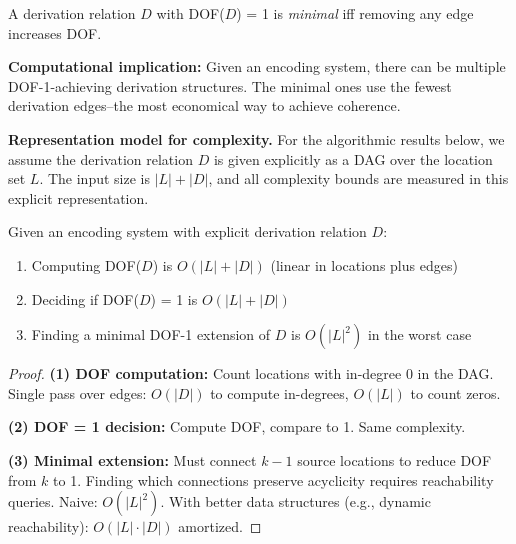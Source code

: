 \begin{corollary}[Minimal DOF = 1 Derivations]\label{cor:minimal-dof1}
A derivation relation $D$ with DOF($D$) = 1 is \emph{minimal} iff removing any edge increases DOF.
\end{corollary}

\textbf{Computational implication:} Given an encoding system, there can be multiple DOF-1-achieving derivation structures. The minimal ones use the fewest derivation edges--the most economical way to achieve coherence.

\textbf{Representation model for complexity.} For the algorithmic results below, we assume the derivation relation $D$ is given explicitly as a DAG over the location set $L$. The input size is $|L| + |D|$, and all complexity bounds are measured in this explicit representation.

\begin{theorem}\label{thm:dof-complexity}
Given an encoding system with explicit derivation relation $D$:
\begin{enumerate}
\tightlist
\item Computing DOF($D$) is $O(|L| + |D|)$ (linear in locations plus edges)
\item Deciding if DOF($D$) = 1 is $O(|L| + |D|)$
\item Finding a minimal DOF-1 extension of $D$ is $O(|L|^2)$ in the worst case
\end{enumerate}
\end{theorem}

\begin{proof}
\textbf{(1) DOF computation:} Count locations with in-degree 0 in the DAG. Single pass over edges: $O(|D|)$ to compute in-degrees, $O(|L|)$ to count zeros.

\textbf{(2) DOF = 1 decision:} Compute DOF, compare to 1. Same complexity.

\textbf{(3) Minimal extension:} Must connect $k-1$ source locations to reduce DOF from $k$ to 1. Finding which connections preserve acyclicity requires reachability queries. Naive: $O(|L|^2)$. With better data structures (e.g., dynamic reachability): $O(|L| \cdot |D|)$ amortized.
\end{proof}

